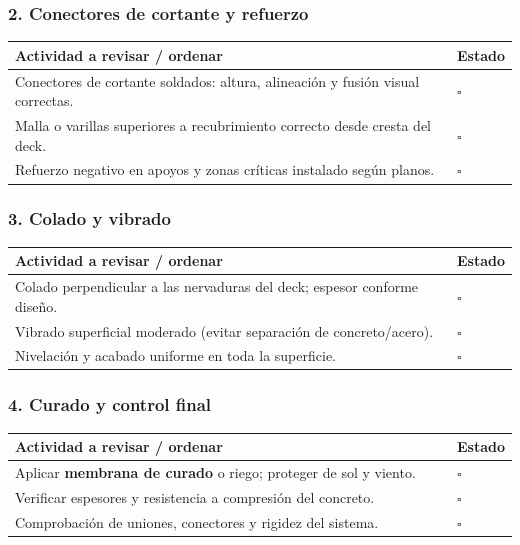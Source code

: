 \documentclass[12pt]{article}
\newcommand{\cbox}{\(\square\)} %
\begin{document}
 \subsubsection*{2. Conectores de cortante y refuerzo}
 \begin{tabularx}{\linewidth}{>{\raggedright\arraybackslash}p{0.93\linewidth} >{\centering\arraybackslash}m{0.07\linewidth}}
 	\toprule
 	\textbf{Actividad a revisar / ordenar} & \textbf{Estado}\\
 	\midrule
 	Conectores de cortante soldados: altura, alineación y fusión visual correctas. & \cbox \\
 	Malla o varillas superiores a recubrimiento correcto desde cresta del deck. & \cbox \\
 	Refuerzo negativo en apoyos y zonas críticas instalado según planos. & \cbox \\
 	\bottomrule
 \end{tabularx}
 
 \subsubsection*{3. Colado y vibrado}
 \begin{tabularx}{\linewidth}{>{\raggedright\arraybackslash}p{0.93\linewidth} >{\centering\arraybackslash}m{0.07\linewidth}}
 	\toprule
 	\textbf{Actividad a revisar / ordenar} & \textbf{Estado}\\
 	\midrule
 	Colado perpendicular a las nervaduras del deck; espesor conforme diseño. & \cbox \\
 	Vibrado superficial moderado (evitar separación de concreto/acero). & \cbox \\
 	Nivelación y acabado uniforme en toda la superficie. & \cbox \\
 	\bottomrule
 \end{tabularx}
 
 \subsubsection*{4. Curado y control final}
 \begin{tabularx}{\linewidth}{>{\raggedright\arraybackslash}p{0.93\linewidth} >{\centering\arraybackslash}m{0.07\linewidth}}
 	\toprule
 	\textbf{Actividad a revisar / ordenar} & \textbf{Estado}\\
 	\midrule
 	Aplicar \textbf{membrana de curado} o riego; proteger de sol y viento. & \cbox \\
 	Verificar espesores y resistencia a compresión del concreto. & \cbox \\
 	Comprobación de uniones, conectores y rigidez del sistema. & \cbox \\
 	\bottomrule
 \end{tabularx}
 
\end{document}
